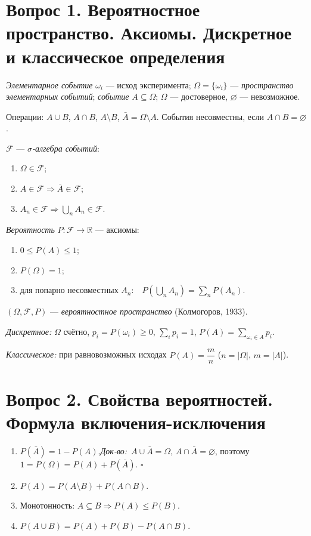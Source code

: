 \section*{Вопрос 1. Вероятностное пространство. Аксиомы. Дискретное и классическое определения}

\textit{Элементарное событие} $\omega_i$ — исход эксперимента; $\Omega=\{\omega_i\}$ — \textit{пространство элементарных событий}; \textit{событие} $A\subseteq\Omega$; $\Omega$ — достоверное, $\varnothing$ — невозможное.

Операции: $A\cup B$, $A\cap B$, $A\setminus B$, $\bar A=\Omega\setminus A$. События несовместны, если $A\cap B=\varnothing$.

$\mathcal{F}$ — \textit{$\sigma$-алгебра событий}:
\begin{enumerate}
  \item $\Omega\in\mathcal{F}$;
  \item $A\in\mathcal{F}\Rightarrow\bar A\in\mathcal{F}$;
  \item $A_n\in\mathcal{F}\Rightarrow\bigcup_n A_n\in\mathcal{F}$.
\end{enumerate}

\textit{Вероятность} $P\colon\mathcal{F}\to\mathbb{R}$ — аксиомы:
\begin{enumerate}
  \item $0\le P(A)\le 1$;
  \item $P(\Omega)=1$;
  \item для попарно несовместных $A_n$:\ \ $P\!\left(\bigcup_n A_n\right)=\sum_n P(A_n)$.
\end{enumerate}

$(\Omega,\mathcal{F},P)$ — \textit{вероятностное пространство} (Колмогоров, 1933).

\textit{Дискретное:} $\Omega$ счётно, $p_i=P(\omega_i)\ge0$, $\sum_i p_i=1$, $P(A)=\sum_{\omega_i\in A}p_i$.

\textit{Классическое:} при равновозможных исходах $P(A)=\dfrac{m}{n}$ ($n=|\Omega|$, $m=|A|$).

\section*{Вопрос 2. Свойства вероятностей. Формула включения-исключения}

\begin{enumerate}
  \item $P(\bar A)=1-P(A)$.\quad \textit{Док-во:}\ $A\cup\bar A=\Omega$, $A\cap\bar A=\varnothing$, поэтому $1=P(\Omega)=P(A)+P(\bar A)$. \hfill$\square$
  \item $P(A)=P(A\setminus B)+P(A\cap B)$.
  \item Монотонность: $A\subseteq B\Rightarrow P(A)\le P(B)$.
  \item $P(A\cup B)=P(A)+P(B)-P(A\cap B)$.
\end{enumerate}


